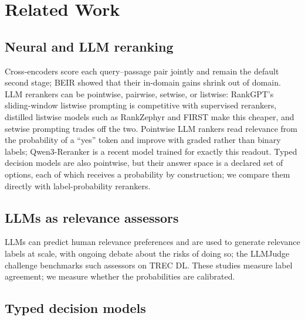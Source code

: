\section{Related Work}

\subsection{Neural and LLM reranking}

Cross-encoders score each query--passage pair jointly\cite{nogueira2019monobert,nogueira2020monot5} and remain the default second stage; BEIR showed that their in-domain gains shrink out of domain\cite{thakur2021beir}.
LLM rerankers can be pointwise, pairwise, setwise, or listwise: RankGPT's sliding-window listwise prompting is competitive with supervised rerankers\cite{sun2023rankgpt}, distilled listwise models such as RankZephyr and FIRST make this cheaper\cite{pradeep2023rankzephyr,reddy2024first}, and setwise prompting trades off the two\cite{zhuang2023setwise}.
Pointwise LLM rankers read relevance from the probability of a ``yes'' token and improve with graded rather than binary labels\cite{zhuang2023beyond}; Qwen3-Reranker is a recent model trained for exactly this readout\cite{qwen3embedding}.
Typed decision models are also pointwise, but their answer space is a declared set of options, each of which receives a probability by construction; we compare them directly with label-probability rerankers.

\subsection{LLMs as relevance assessors}

LLMs can predict human relevance preferences\cite{thomas2023llmpref} and are used to generate relevance labels at scale\cite{upadhyay2024umbrela}, with ongoing debate about the risks of doing so\cite{faggioli2023perspectives,clarke2024cantreplace}; the LLMJudge challenge\cite{rahmani2024llmjudge} benchmarks such assessors on TREC DL. These studies measure label agreement; we measure whether the probabilities are calibrated.

\subsection{Typed decision models}

